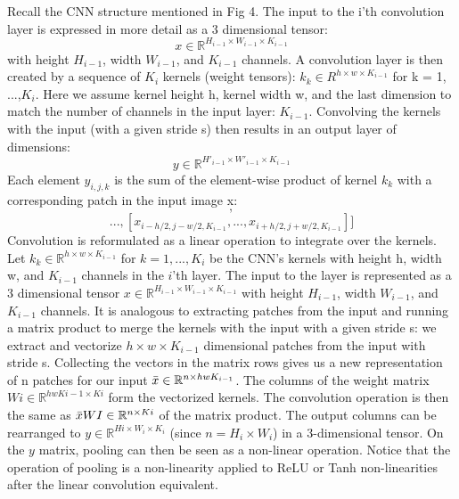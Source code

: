 \documentclass[journal]{IEEEtran}
\begin{document}
Recall the CNN structure mentioned in Fig 4.
The input to the i'th convolution layer is
expressed in more detail as a 3 dimensional tensor: 
\begin{equation*}
    x \in \mathbb{R}^{H_{i-1} \times W_{i-1} \times K_{i-1}}
\end{equation*}
with height $H_{i-1}$, width $W_{i-1}$, and $K_{i-1}$ channels. A convolution layer is then created by a sequence of $K_i$ kernels (weight tensors): $k_k \in R^{h \times w \times K_{i-1}}$
for k = 1, ...,$K_i$. Here we assume kernel height h, kernel width w, and the last dimension to match the number of channels in the input layer: $K_{i-1}$. Convolving the kernels with the input (with a given stride s) then results in an output layer of dimensions: 
\begin{equation*}
    y \in \mathbb{R}^{H'_{i-1} \times W'_{i-1} \times K_{i-1}} 
\end{equation*}
Each element $y_{i,j,k}$ is the sum of
the element-wise product of kernel $k_k$ with a corresponding patch in the input image x:
\begin{equation*}
    [[x_{i-h/2,j-w/2,1}, ..., x_{i+h/2,j+w/2,1}], 
\end{equation*}
\begin{equation*}
    ..., [x_{i-h/2,j-w/2,K_{i-1}} , ..., x_{i+h/2,j+w/2,K_{i-1}} ]]
\end{equation*}
Convolution is reformulated as a linear operation to integrate over the kernels. Let
$k_k \in \mathbb{R}^{h \times w \times K_{i-1}}$ for $k = 1, ...,K_i$ be the CNN’s kernels with height h, width w, and $K_{i-1}$
channels in the $i$’th layer. The input to the layer is represented as a 3 dimensional tensor
$x \in \mathbb{R}^{H_{i-1} \times W_{i-1} \times K_{i-1}}$ with height $H_{i-1}$, width $W_{i-1}$, and $K_{i-1}$ channels. It is analogous to extracting patches from the input and running a matrix product to merge the kernels with the input with
a given stride s: we extract and vectorize $h \times w \times K_{i-1}$ dimensional patches from the input with stride s.  Collecting the vectors in the matrix rows gives us a new representation of n patches for our input $\Bar{x} \in \mathbb{R}^{n \times hwK_{i-1}}$. 
The columns of the weight matrix $W i \in
\mathbb{R}^{hwK {i-1} \times K i}$ form the vectorized kernels.
The convolution operation is then the same as $\Bar{x}W I
\in \mathbb{R}^{n \times K i}$ of the matrix product.
The output columns can be rearranged to $y \in \mathbb{R}^{H i \times W_i
\times K_i}$ (since $n = H_i \times W_i$) in a 3-dimensional tensor.
On the $y$ matrix, pooling can
then be seen as a non-linear operation.
Notice that the operation of pooling is a non-linearity applied
to ReLU or Tanh non-linearities after the linear convolution equivalent\cite{kendall2019geometry}. 
\end{document}

